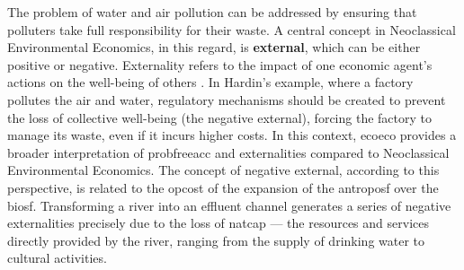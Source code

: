 \documentclass[./main_en.tex]{subfiles}
\begin{document}
\noindent The problem of water and air pollution can be addressed by ensuring that polluters take full responsibility for their waste. A central concept in Neoclassical Environmental Economics, in this regard, is \textbf{\gls{external}}, which can be either positive or negative. Externality refers to the impact of one economic agent's actions on the well-being of others \cite{Mankiw2002a}. In Hardin's example, where a factory pollutes the air and water, regulatory mechanisms should be created to prevent the loss of collective well-being (the negative \gls{external}), forcing the factory to manage its waste, even if it incurs higher costs. In this context, \gls{ecoeco} provides a broader interpretation of \gls{probfreeacc} and externalities compared to Neoclassical Environmental Economics. The concept of negative \gls{external}, according to this perspective, is related to the \gls{opcost} of the expansion of the \gls{antroposf} over the \gls{biosf}. Transforming a river into an effluent channel generates a series of negative externalities precisely due to the loss of \gls{natcap} — the resources and services directly provided by the river, ranging from the supply of drinking water to cultural activities.
\end{document}
